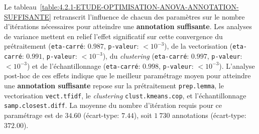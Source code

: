 			Le tableau~\ref{table:4.2.1-ETUDE-OPTIMISATION-ANOVA-ANNOTATION-SUFFISANTE} retranscrit l'influence de chacun des paramètres sur le nombre d'itérations nécessaires pour atteindre une \textbf{annotation suffisante}.
			Les analyses de variance mettent en relief l'effet significatif sur cette convergence du prétraitement (\texttt{eta-carré}: $0.987$, \texttt{p-valeur}: $< 10^{-3}$), de la vectorisation (\texttt{eta-carré}: $0.991$, \texttt{p-valeur}: $< 10^{-3}$), du \textit{clustering} (\texttt{eta-carré}: $0.997$, \texttt{p-valeur}: $< 10^{-3}$) et de l'échantillonnage (\texttt{eta-carré}: $0.998$, \texttt{p-valeur}: $< 10^{-3}$).
			L'analyse post-hoc de ces effets indique que le meilleur paramétrage moyen pour atteindre une \textbf{annotation suffisante} repose sur la prétraitement \texttt{prep.lemma}, le vectorisation \texttt{vect.tfidf}, le \textit{clustering} \texttt{clust.kmeans.cop}, et l'échantillonnage \texttt{samp.closest.diff}. La moyenne du nombre d'itération requis pour ce paramétrage est de $34.60$ (écart-type: $7.44$), soit $1~730$ annotations (écart-type: $372.00$).
